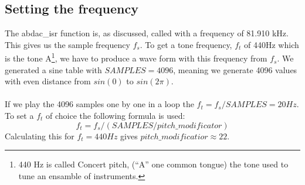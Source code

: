 \subsection{Setting the frequency}
The abdac\_isr function is, as discussed, called with a frequency of 81.910 kHz. This gives us the sample frequency $ f_s $. To
get a tone frequency, $f_t$ of 440Hz which is the tone A\footnote{440 Hz is called Concert pitch, (``A'' one common tongue) the tone used to tune an ensamble of instruments.},
we have to produce a wave form with this frequency from $f_s$. We generated a sine table with $SAMPLES = 4096$, meaning we
generate 4096 values with even distance from $sin(0)$ to $sin(2\pi)$.\\
\\
If we play the 4096 samples one by one in a loop the $f_t = f_s / SAMPLES = 20Hz$. To set a $f_t$ of choice the following formula
is used:
$$f_t = f_s / (SAMPLES / pitch\_modificator) $$
Calculating this for $f_t = 440 Hz$ gives $pitch\_modificatior \approx 22$.
